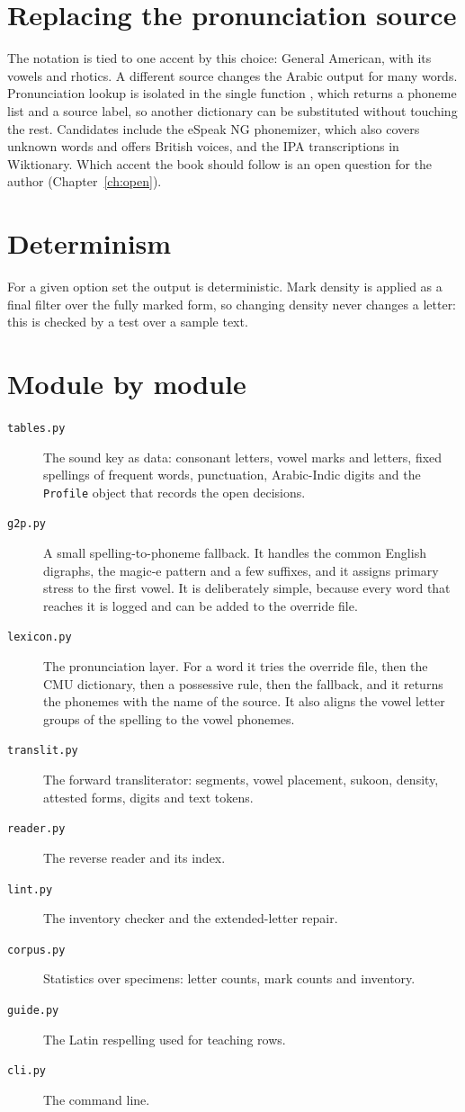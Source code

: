 \section{Replacing the pronunciation source}
The notation is tied to one accent by this choice: General American, with its vowels and rhotics. A different source changes the Arabic output for many words. Pronunciation lookup is isolated in the single function , which returns a phoneme list and a source label, so another dictionary can be substituted without touching the rest. Candidates include the eSpeak NG phonemizer, which also covers unknown words and offers British voices, and the IPA transcriptions in Wiktionary. Which accent the book should follow is an open question for the author (Chapter~\ref{ch:open}).

\section{Determinism}
For a given option set the output is deterministic. Mark density is applied as a final filter over the fully marked form, so changing density never changes a letter: this is checked by a test over a sample text.

\section{Module by module}
\begin{description}
\item[\texttt{tables.py}] The sound key as data: consonant letters, vowel marks and letters, fixed spellings of frequent words, punctuation, Arabic-Indic digits and the \texttt{Profile} object that records the open decisions.
\item[\texttt{g2p.py}] A small spelling-to-phoneme fallback. It handles the common English digraphs, the magic-e pattern and a few suffixes, and it assigns primary stress to the first vowel. It is deliberately simple, because every word that reaches it is logged and can be added to the override file.
\item[\texttt{lexicon.py}] The pronunciation layer. For a word it tries the override file, then the CMU dictionary, then a possessive rule, then the fallback, and it returns the phonemes with the name of the source. It also aligns the vowel letter groups of the spelling to the vowel phonemes.
\item[\texttt{translit.py}] The forward transliterator: segments, vowel placement, sukoon, density, attested forms, digits and text tokens.
\item[\texttt{reader.py}] The reverse reader and its index.
\item[\texttt{lint.py}] The inventory checker and the extended-letter repair.
\item[\texttt{corpus.py}] Statistics over specimens: letter counts, mark counts and inventory.
\item[\texttt{guide.py}] The Latin respelling used for teaching rows.
\item[\texttt{cli.py}] The command line.
\end{description}


